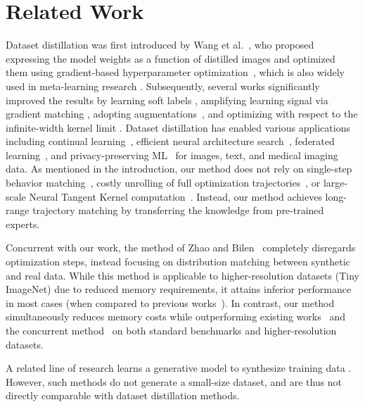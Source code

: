 \documentclass[main.tex]{subfiles}
\begin{document}
\section{Related Work}



Dataset distillation was first introduced by Wang et al.~\cite{dd}, who proposed expressing the model weights as a function of distilled images and optimized them using gradient-based hyperparameter optimization~\cite{maclaurin2015gradient}, which is also widely used in meta-learning research \citep{finn2017model,nichol2018first}. %
Subsequently, several works significantly improved the results by learning soft labels \cite{bohdal2020flexible,sucholutsky2021soft}, amplifying learning signal via gradient matching \cite{dc}, adopting augmentations~\cite{dsa}, and optimizing with respect to the infinite-width kernel limit \cite{nguyen2020dataset,nguyen2021dataset}. Dataset distillation has enabled various applications including continual learning~\cite{dd,dc,dsa}, efficient neural architecture search~\cite{dc,dsa}, federated learning~\cite{goetz2020federated,zhou2020distilled,sucholutsky2020secdd}, and privacy-preserving ML~\cite{sucholutsky2020secdd,li2020soft} for images, text, and medical imaging data. As mentioned in the introduction, our method does not rely on single-step behavior matching~\cite{dc,dsa},  costly unrolling of full optimization trajectories~\cite{dd,sucholutsky2021soft}, or large-scale Neural Tangent Kernel computation~\cite{nguyen2020dataset,nguyen2021dataset}. Instead, our method achieves long-range trajectory matching by transferring the knowledge from pre-trained experts. %


Concurrent with our work, the method of Zhao and Bilen~\cite{dm} completely disregards optimization steps, instead focusing on distribution matching between synthetic and real data. While this method is applicable to higher-resolution datasets (\eg Tiny ImageNet) due to reduced memory requirements, it attains inferior performance in most cases (\eg when compared to previous works~\cite{dc,dsa}). In contrast, our method simultaneously reduces memory costs while outperforming existing works~\cite{dc,dsa} and the concurrent method~\cite{dm} on both standard benchmarks and higher-resolution datasets. 

A related line of research learns a generative model to synthesize training data \cite{such2020generative,masarczyk2020reducing}. However, such methods do not generate a small-size dataset, and are thus not directly comparable with dataset distillation methods.
\end{document}
